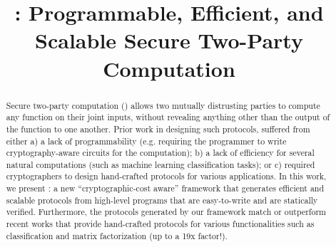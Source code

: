 \documentclass[conference,compsoc]{IEEEtran}
\begin{document}
\title{\tool: Programmable, Efficient, and Scalable Secure Two-Party Computation}





\maketitle
\begin{abstract}
Secure two-party computation (\mpc) allows two mutually distrusting parties to compute any function on their joint inputs, without revealing anything other than the output of the function to one another. %
 Prior work in designing such protocols, suffered from either a) a lack of programmability (e.g. requiring the programmer to write cryptography-aware circuits for the computation); b) a lack of efficiency for several natural computations (such as machine learning classification tasks); or c) required cryptographers to design hand-crafted protocols for various applications. In this work, we present \tool: a new ``cryptographic-cost aware'' \mpc framework that generates efficient and scalable \mpc protocols from high-level programs that 
are easy-to-write and are statically verified. Furthermore, the \mpc protocols generated by our framework match or outperform recent works that provide hand-crafted \mpc protocols for various functionalities such as classification and matrix factorization (up to a 19x factor!).
\end{abstract}
\IEEEpeerreviewmaketitle
\end{document}
